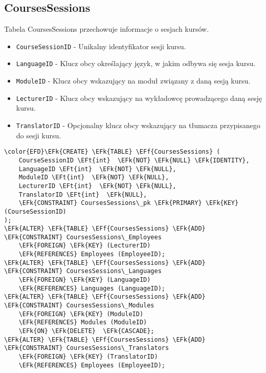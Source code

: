 \documentclass[11pt]{article}
\newcommand{\EFk}[1]{\textcolor{EFk}{\textbf{#1}}} %
\newcommand{\EFf}[1]{\textcolor{EFf}{#1}} %
\newcommand{\EFt}[1]{\textcolor{EFt}{\textbf{#1}}} %
\begin{document}
\subsection{CoursesSessions}
\label{sec:orgce65a56}
Tabela CoursesSessions przechowuje informacje o sesjach kursów.
\begin{itemize}
\item \texttt{CourseSessionID} - Unikalny identyfikator sesji kursu.
\item \texttt{LanguageID} - Klucz obcy określający język, w jakim odbywa się sesja kursu.
\item \texttt{ModuleID} - Klucz obcy wskazujący na moduł związany z daną sesją kursu.
\item \texttt{LecturerID} - Klucz obcy wskazujący na wykładowcę prowadzącego daną sesję kursu.
\item \texttt{TranslatorID} - Opcjonalny klucz obcy wskazujący na tłumacza przypisanego do sesji kursu.
\end{itemize}
\begin{Code}
\begin{Verbatim}
\color{EFD}\EFk{CREATE} \EFk{TABLE} \EFf{CoursesSessions} (
    CourseSessionID \EFt{int}  \EFk{NOT} \EFk{NULL} \EFk{IDENTITY},
    LanguageID \EFt{int}  \EFk{NOT} \EFk{NULL},
    ModuleID \EFt{int}  \EFk{NOT} \EFk{NULL},
    LecturerID \EFt{int}  \EFk{NOT} \EFk{NULL},
    TranslatorID \EFt{int}  \EFk{NULL},
    \EFk{CONSTRAINT} CoursesSessions\_pk \EFk{PRIMARY} \EFk{KEY}  (CourseSessionID)
);
\EFk{ALTER} \EFk{TABLE} \EFf{CoursesSessions} \EFk{ADD} \EFk{CONSTRAINT} CoursesSessions\_Employees
    \EFk{FOREIGN} \EFk{KEY} (LecturerID)
    \EFk{REFERENCES} Employees (EmployeeID);
\EFk{ALTER} \EFk{TABLE} \EFf{CoursesSessions} \EFk{ADD} \EFk{CONSTRAINT} CoursesSessions\_Languages
    \EFk{FOREIGN} \EFk{KEY} (LanguageID)
    \EFk{REFERENCES} Languages (LanguageID);
\EFk{ALTER} \EFk{TABLE} \EFf{CoursesSessions} \EFk{ADD} \EFk{CONSTRAINT} CoursesSessions\_Modules
    \EFk{FOREIGN} \EFk{KEY} (ModuleID)
    \EFk{REFERENCES} Modules (ModuleID)
    \EFk{ON} \EFk{DELETE}  \EFk{CASCADE};
\EFk{ALTER} \EFk{TABLE} \EFf{CoursesSessions} \EFk{ADD} \EFk{CONSTRAINT} CoursesSessions\_Translators
    \EFk{FOREIGN} \EFk{KEY} (TranslatorID)
    \EFk{REFERENCES} Employees (EmployeeID);
\end{Verbatim}
\end{Code}
\end{document}
